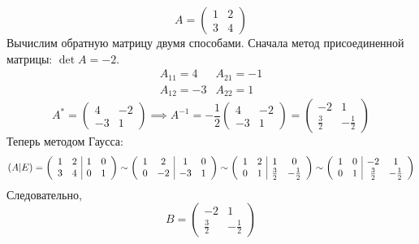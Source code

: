 \documentclass[12pt, a4paper]{article}
\begin{document}
    \begin{exmp}
        \[
            A = \begin{pmatrix} 1 & 2 \\ 3 & 4 \end{pmatrix} 
        \]Вычислим обратную матрицу двумя способами. Сначала метод присоединенной матрицы: \( \det A = -2 \). \[
            \begin{matrix}
                A_{11} = 4 & A_{21} = -1 \\
                A_{12} = -3 & A_{22} = 1
            \end{matrix}
        \] 
        \[
            A^{*} = \begin{pmatrix} 4 & -2 \\ -3 & 1 \end{pmatrix}  \implies A^{-1} = - \frac{1}{2} \begin{pmatrix} 4 & -2 \\ -3 & 1 \end{pmatrix}  = \begin{pmatrix} -2 & 1 \\ \frac{3}{2} & - \frac{1}{2} \end{pmatrix}  
        \] 
        Теперь методом Гаусса: \[
            (A | E) = \left(\begin{array}{c c | c c}
                1 & 2 & 1 & 0 \\
                3 & 4 & 0 & 1
            \end{array}\right) \sim 
            \left( \begin{array}{c c | c c}
                    1 & 2 & 1 & 0 \\
                    0 & -2 & -3 & 1
            \end{array} \right)  \sim 
            \left( \begin{array}{c c | c c}
                    1 & 2 & 1 & 0 \\
                    0 & 1 & \frac{3}{2} & - \frac{1}{2}
            \end{array} \right) \sim 
            \left( \begin{array}{c c | c c}
                    1 & 0 & -2 & 1 \\
                    0 & 1 & \frac{3}{2} & -\frac{1}{2}
            \end{array} \right) 
        \]Следовательно, \[
            B = \begin{pmatrix} -2 & 1 \\ \frac{3}{2} &- \frac{1}{2} \end{pmatrix} 
        \] 
    \end{exmp}
\end{document}
